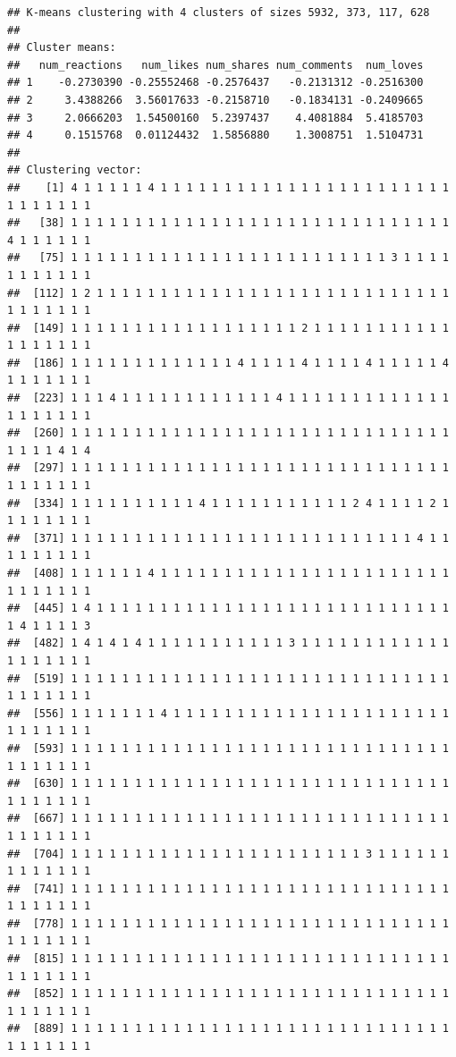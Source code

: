 \documentclass[
]{article}
\begin{document}
\begin{verbatim}
## K-means clustering with 4 clusters of sizes 5932, 373, 117, 628
## 
## Cluster means:
##   num_reactions   num_likes num_shares num_comments  num_loves
## 1    -0.2730390 -0.25552468 -0.2576437   -0.2131312 -0.2516300
## 2     3.4388266  3.56017633 -0.2158710   -0.1834131 -0.2409665
## 3     2.0666203  1.54500160  5.2397437    4.4081884  5.4185703
## 4     0.1515768  0.01124432  1.5856880    1.3008751  1.5104731
## 
## Clustering vector:
##    [1] 4 1 1 1 1 1 4 1 1 1 1 1 1 1 1 1 1 1 1 1 1 1 1 1 1 1 1 1 1 1 1 1 1 1 1 1 1
##   [38] 1 1 1 1 1 1 1 1 1 1 1 1 1 1 1 1 1 1 1 1 1 1 1 1 1 1 1 1 1 1 4 1 1 1 1 1 1
##   [75] 1 1 1 1 1 1 1 1 1 1 1 1 1 1 1 1 1 1 1 1 1 1 1 1 1 3 1 1 1 1 1 1 1 1 1 1 1
##  [112] 1 2 1 1 1 1 1 1 1 1 1 1 1 1 1 1 1 1 1 1 1 1 1 1 1 1 1 1 1 1 1 1 1 1 1 1 1
##  [149] 1 1 1 1 1 1 1 1 1 1 1 1 1 1 1 1 1 1 2 1 1 1 1 1 1 1 1 1 1 1 1 1 1 1 1 1 1
##  [186] 1 1 1 1 1 1 1 1 1 1 1 1 1 4 1 1 1 1 4 1 1 1 1 4 1 1 1 1 1 4 1 1 1 1 1 1 1
##  [223] 1 1 1 4 1 1 1 1 1 1 1 1 1 1 1 1 4 1 1 1 1 1 1 1 1 1 1 1 1 1 1 1 1 1 1 1 1
##  [260] 1 1 1 1 1 1 1 1 1 1 1 1 1 1 1 1 1 1 1 1 1 1 1 1 1 1 1 1 1 1 1 1 1 1 4 1 4
##  [297] 1 1 1 1 1 1 1 1 1 1 1 1 1 1 1 1 1 1 1 1 1 1 1 1 1 1 1 1 1 1 1 1 1 1 1 1 1
##  [334] 1 1 1 1 1 1 1 1 1 1 4 1 1 1 1 1 1 1 1 1 1 1 2 4 1 1 1 1 2 1 1 1 1 1 1 1 1
##  [371] 1 1 1 1 1 1 1 1 1 1 1 1 1 1 1 1 1 1 1 1 1 1 1 1 1 1 1 4 1 1 1 1 1 1 1 1 1
##  [408] 1 1 1 1 1 1 4 1 1 1 1 1 1 1 1 1 1 1 1 1 1 1 1 1 1 1 1 1 1 1 1 1 1 1 1 1 1
##  [445] 1 4 1 1 1 1 1 1 1 1 1 1 1 1 1 1 1 1 1 1 1 1 1 1 1 1 1 1 1 1 1 4 1 1 1 1 3
##  [482] 1 4 1 4 1 4 1 1 1 1 1 1 1 1 1 1 1 3 1 1 1 1 1 1 1 1 1 1 1 1 1 1 1 1 1 1 1
##  [519] 1 1 1 1 1 1 1 1 1 1 1 1 1 1 1 1 1 1 1 1 1 1 1 1 1 1 1 1 1 1 1 1 1 1 1 1 1
##  [556] 1 1 1 1 1 1 1 4 1 1 1 1 1 1 1 1 1 1 1 1 1 1 1 1 1 1 1 1 1 1 1 1 1 1 1 1 1
##  [593] 1 1 1 1 1 1 1 1 1 1 1 1 1 1 1 1 1 1 1 1 1 1 1 1 1 1 1 1 1 1 1 1 1 1 1 1 1
##  [630] 1 1 1 1 1 1 1 1 1 1 1 1 1 1 1 1 1 1 1 1 1 1 1 1 1 1 1 1 1 1 1 1 1 1 1 1 1
##  [667] 1 1 1 1 1 1 1 1 1 1 1 1 1 1 1 1 1 1 1 1 1 1 1 1 1 1 1 1 1 1 1 1 1 1 1 1 1
##  [704] 1 1 1 1 1 1 1 1 1 1 1 1 1 1 1 1 1 1 1 1 1 1 1 3 1 1 1 1 1 1 1 1 1 1 1 1 1
##  [741] 1 1 1 1 1 1 1 1 1 1 1 1 1 1 1 1 1 1 1 1 1 1 1 1 1 1 1 1 1 1 1 1 1 1 1 1 1
##  [778] 1 1 1 1 1 1 1 1 1 1 1 1 1 1 1 1 1 1 1 1 1 1 1 1 1 1 1 1 1 1 1 1 1 1 1 1 1
##  [815] 1 1 1 1 1 1 1 1 1 1 1 1 1 1 1 1 1 1 1 1 1 1 1 1 1 1 1 1 1 1 1 1 1 1 1 1 1
##  [852] 1 1 1 1 1 1 1 1 1 1 1 1 1 1 1 1 1 1 1 1 1 1 1 1 1 1 1 1 1 1 1 1 1 1 1 1 1
##  [889] 1 1 1 1 1 1 1 1 1 1 1 1 1 1 1 1 1 1 1 1 1 1 1 1 1 1 1 1 1 1 1 1 1 1 1 1 1

\end{verbatim}
\end{document}
